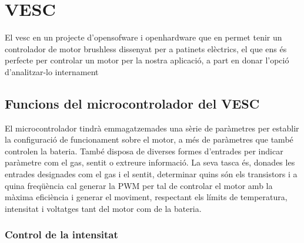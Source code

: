 \chapter{VESC}
\label{chap:VESC}


El vesc en un projecte d'opensofware i openhardware que en permet tenir un controlador de motor brushless dissenyat per a patinets elèctrics, el que ens és perfecte per controlar un motor per la nostra aplicació, a part en donar l'opció d'analitzar-lo internament

\section{Funcions del microcontrolador del VESC}

El microcontrolador tindrà emmagatzemades una sèrie de paràmetres per establir la configuració de funcionament sobre el motor, a més de paràmetres que també controlen la bateria. També disposa de diverses formes d'entrades per indicar paràmetre com el gas, sentit o extreure informació. La seva tasca és, donades les entrades designades com el gas i el sentit, determinar quins són els transistors i a quina freqüència cal generar la PWM  per tal de controlar el motor amb la màxima eficiència i generar el moviment, respectant els límits de temperatura, intensitat i voltatges tant del motor com de la bateria. 
    
\subsection{Control de la intensitat}

